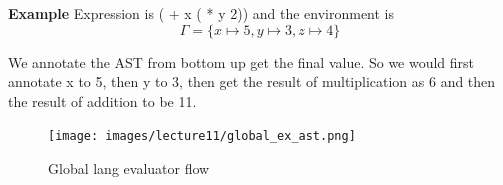     \textbf{Example}
    Expression is ( + x ( * y 2)) and the environment is 
    $$\Gamma = \{ x \mapsto 5, y \mapsto 3, z \mapsto 4\}$$

    We annotate the AST from bottom up get the final value. So we would first annotate x to 5, then y to 3, then get the result of multiplication as 6 and then the result of addition to be 11.

    \begin{figure}[htbp]
        \center
        \texttt{[image: images/lecture11/global\_ex\_ast.png]}
        \caption{Global lang evaluator flow}
    \end{figure}
    
    